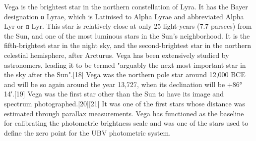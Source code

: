 Vega is the brightest star in the northern constellation of Lyra. It has the Bayer designation α Lyrae, which is Latinised to Alpha Lyrae and abbreviated Alpha Lyr or α Lyr. This star is relatively close at only 25 light-years (7.7 parsecs) from the Sun, and one of the most luminous stars in the Sun's neighborhood. It is the fifth-brightest star in the night sky, and the second-brightest star in the northern celestial hemisphere, after Arcturus. Vega has been extensively studied by astronomers, leading it to be termed "arguably the next most important star in the sky after the Sun".[18] Vega was the northern pole star around 12,000 BCE and will be so again around the year 13,727, when its declination will be +86° 14′.[19] Vega was the first star other than the Sun to have its image and spectrum photographed.[20][21] It was one of the first stars whose distance was estimated through parallax measurements. Vega has functioned as the baseline for calibrating the photometric brightness scale and was one of the stars used to define the zero point for the UBV photometric system.
